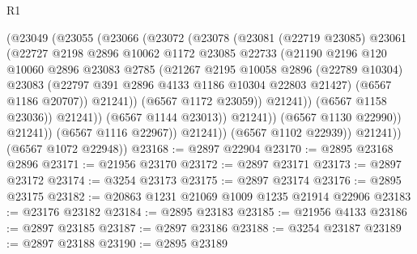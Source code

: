 \begin{lexlean}{R1}
\begin{coremodule}
                              (@23049
                                (@23055
                                  (@23066
                                    (@23072
                                      (@23078
                                        (@23081
                                          (@22719 @23085)
                                          @23061
                                          (@22727
                                            @2198
                                            @2896
                                            @10062
                                            @1172
                                            @23085
                                            @22733
                                            (@21190
                                              @2196
                                              @120
                                              @10060
                                              @2896
                                              @23083
                                              @2785
                                              (@21267
                                                @2195
                                                @10058
                                                @2896
                                                (@22789 @10304)
                                                @23083
                                                (@22797 @391 @2896 @4133 @1186 @10304 @22803 @21427)
                                                (@6567 @1186 @20707))
                                              @21241))
                                          (@6567 @1172 @23059))
                                        @21241))
                                    (@6567 @1158 @23036))
                                  @21241))
                              (@6567 @1144 @23013))
                            @21241))
                        (@6567 @1130 @22990))
                      @21241))
                  (@6567 @1116 @22967))
                @21241))
            (@6567 @1102 @22939))
          @21241))
      (@6567 @1072 @22948))
@23168 := @2897 @22904
@23170 := @2895 @23168 @2896
@23171 := @21956 @23170
@23172 := @2897 @23171
@23173 := @2897 @23172
@23174 := @3254 @23173
@23175 := @2897 @23174
@23176 := @2895 @23175
@23182 := @20863 @1231 @21069 @1009 @1235 @21914 @22906
@23183 := @23176 @23182
@23184 := @2895 @23183
@23185 := @21956 @4133
@23186 := @2897 @23185
@23187 := @2897 @23186
@23188 := @3254 @23187
@23189 := @2897 @23188
@23190 := @2895 @23189

\end{coremodule}
\end{lexlean}
